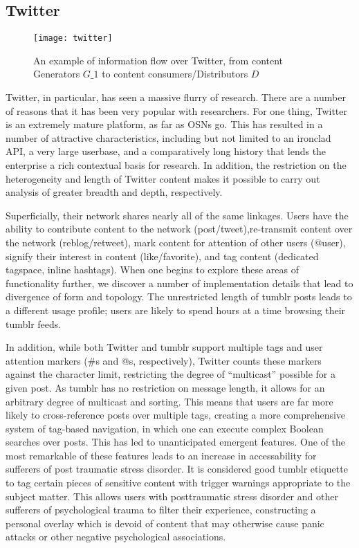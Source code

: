 \subsection{Twitter}
\begin{figure}[bht]
\centering
 \texttt{[image: twitter]}
 \caption{An example of information flow over Twitter, from content Generators \(G\_1\) to content consumers/Distributors \(D\)}
 \label{fig:twitter}
\end{figure}
Twitter, in particular, has seen a massive flurry of research.  There 
are a number of reasons that it has been very popular with researchers.  
For one thing, Twitter is an extremely mature platform, as far as OSNs 
go.  This has resulted in a number of attractive characteristics, 
including but not limited to an ironclad API, a very large userbase, 
and a comparatively long history that lends the enterprise a rich 
contextual basis for research.  In addition, the restriction on the 
heterogeneity and length of Twitter content makes it possible to carry 
out analysis of greater breadth and depth, respectively.


Superficially, their network shares nearly all of the same linkages.  
Users have the ability to contribute content to the network 
(post/tweet),re-transmit content over the network (reblog/retweet), 
mark content for attention of other users (@user), signify their 
interest in content (like/favorite), and tag content (dedicated 
tagspace, inline hashtags). When one begins to explore these areas of 
functionality further, we discover a number of implementation details 
that lead to divergence of form and topology.  The unrestricted length 
of tumblr posts leads to a different usage profile; users are likely to 
spend hours at a time\cite{duggan2013demographics} browsing their 
tumblr feeds.  


In addition, while both Twitter and tumblr support multiple tags and 
user attention markers (\#s and @s, respectively), Twitter counts these 
markers against the character limit, restricting the degree of 
``multicast'' possible for a given post.  As tumblr has no restriction 
on message length, it allows for an arbitrary degree of multicast and 
sorting.  This means that users are far more likely to cross-reference 
posts over multiple tags, creating a more comprehensive system of tag-based 
navigation, in which one can execute complex Boolean searches over posts.  
This has led to unanticipated emergent features. One of the most 
remarkable of these features leads to an increase in accessability for 
sufferers of post traumatic stress disorder.  It is considered good 
tumblr etiquette to tag certain pieces of sensitive content with trigger 
warnings appropriate to the subject matter.  This allows users with 
posttraumatic stress disorder and other sufferers of psychological 
trauma to filter their experience, constructing a personal overlay 
which is devoid of content that may otherwise cause panic attacks or 
other negative psychological associations.


